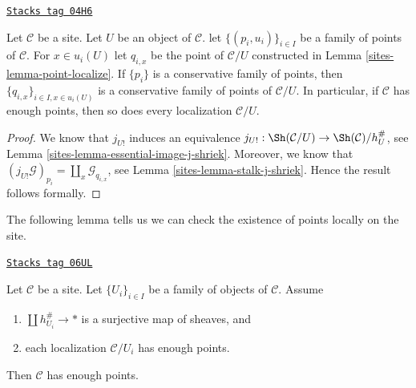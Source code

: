 \begin{lemma}
\label{sites-lemma-localize-enough}
\href{https://stacks.math.columbia.edu/tag/04H6}{\texttt{Stacks tag 04H6}}

Let $\mathcal{C}$ be a site. Let $U$ be an object of $\mathcal{C}$.
let $\{(p_i, u_i)\}_{i\in I}$ be a family of points of $\mathcal{C}$.
For $x \in u_i(U)$ let $q_{i, x}$ be the point of $\mathcal{C}/U$
constructed in
Lemma \ref{sites-lemma-point-localize}.
If $\{p_i\}$ is a conservative family of points, then
$\{q_{i, x}\}_{i \in I, x \in u_i(U)}$ is a conservative
family of points of $\mathcal{C}/U$.
In particular, if $\mathcal{C}$ has enough points, then so
does every localization $\mathcal{C}/U$.
\end{lemma}

\begin{proof}

We know that $j_{U!}$ induces an equivalence
$j_{U!} : \Sh(\mathcal{C}/U) \to \Sh(\mathcal{C})/h_U^\#$, see
Lemma \ref{sites-lemma-essential-image-j-shriek}.
Moreover, we know that
$(j_{U!}\mathcal{G})_{p_i} = \coprod_x \mathcal{G}_{q_{i, x}}$, see
Lemma \ref{sites-lemma-stalk-j-shriek}.
Hence the result follows formally.
\end{proof}

The following lemma tells us we can check the existence of points
locally on the site.

\begin{lemma}
\label{sites-lemma-enough-points-local}
\href{https://stacks.math.columbia.edu/tag/06UL}{\texttt{Stacks tag 06UL}}

Let $\mathcal{C}$ be a site. Let $\{U_i\}_{i \in I}$ be a family of
objects of $\mathcal{C}$. Assume
\begin{enumerate}
\item $\coprod h_{U_i}^\# \to *$ is a surjective map of sheaves, and
\item each localization $\mathcal{C}/U_i$ has enough points.
\end{enumerate}
Then $\mathcal{C}$ has enough points.
\end{lemma}

